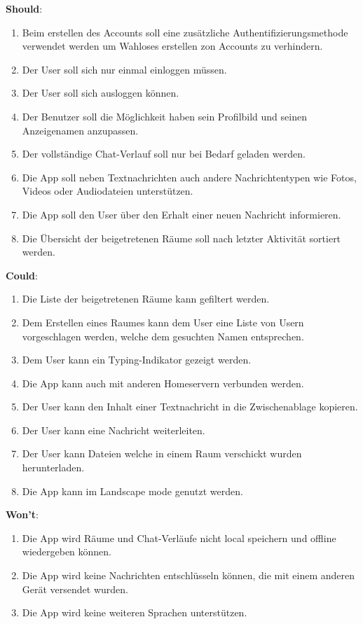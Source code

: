     \textbf{Should}:
    \begin{enumerate}[label={\roman*.}, leftmargin=2.5cm]
        \item Beim erstellen des Accounts soll eine zusätzliche Authentifizierungsmethode verwendet werden um Wahloses erstellen zon Accounts zu verhindern.
        \item Der User soll sich nur einmal einloggen müssen.
        \item Der User soll sich ausloggen können.
        \item Der Benutzer soll die Möglichkeit haben sein Profilbild und seinen Anzeigenamen anzupassen.
        \item Der vollständige Chat-Verlauf soll nur bei Bedarf geladen werden.
        \item Die App soll neben Textnachrichten auch andere Nachrichtentypen wie Fotos, Videos oder Audiodateien unterstützen.
        \item Die App soll den User über den Erhalt einer neuen Nachricht informieren.
        \item Die Übersicht der beigetretenen Räume soll nach letzter Aktivität sortiert werden.
    \end{enumerate}


    \textbf{Could}:
    \begin{enumerate}[label={\roman*.}, leftmargin=2.5cm]
        \item Die Liste der beigetretenen Räume kann gefiltert werden.
        \item Dem Erstellen eines Raumes kann dem User eine Liste von Usern vorgeschlagen werden, welche dem gesuchten Namen entsprechen.
        \item Dem User kann ein Typing-Indikator gezeigt werden.
        \item Die App kann auch mit anderen Homeservern verbunden werden.
        \item Der User kann den Inhalt einer Textnachricht in die Zwischenablage kopieren.
        \item Der User kann eine Nachricht weiterleiten.
        \item Der User kann Dateien welche in einem Raum verschickt wurden herunterladen.
        \item Die App kann im Landscape mode genutzt werden.
    \end{enumerate}

    \textbf{Won't}:
    \begin{enumerate}[label={\roman*.}, leftmargin=2.5cm]
        \item Die App wird Räume und Chat-Verläufe nicht local speichern und offline wiedergeben können.
        \item Die App wird keine Nachrichten entschlüsseln können, die mit einem anderen Gerät versendet wurden.
        \item Die App wird keine weiteren Sprachen unterstützen.
    \end{enumerate}

